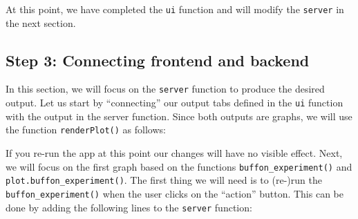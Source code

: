 \documentclass[12pt,]{krantz}
\newenvironment{Shaded}{\begin{snugshade}}{\end{snugshade}}
\newcommand{\KeywordTok}[1]{\textcolor[rgb]{0.27,0.27,0.27}{\textbf{#1}}}
\newcommand{\DataTypeTok}[1]{\textcolor[rgb]{0.27,0.27,0.27}{#1}}
\newcommand{\DecValTok}[1]{\textcolor[rgb]{0.06,0.06,0.06}{#1}}
\newcommand{\StringTok}[1]{\textcolor[rgb]{0.5,0.5,0.5}{#1}}
\newcommand{\CommentTok}[1]{\textcolor[rgb]{0.37,0.37,0.37}{\textit{#1}}}
\newcommand{\ControlFlowTok}[1]{\textcolor[rgb]{0.27,0.27,0.27}{\textbf{#1}}}
\newcommand{\OperatorTok}[1]{\textcolor[rgb]{0.43,0.43,0.43}{\textbf{#1}}}
\newcommand{\NormalTok}[1]{#1}
\begin{document}
At this point, we have completed the \texttt{ui} function and will
modify the \texttt{server} in the next section.

\subsection{Step 3: Connecting frontend and
backend}\label{step-3-connecting-frontend-and-backend}

In this section, we will focus on the \texttt{server} function to
produce the desired output. Let us start by ``connecting'' our output
tabs defined in the \texttt{ui} function with the output in the server
function. Since both outputs are graphs, we will use the function
\texttt{renderPlot()} as follows:

\begin{Shaded}
\end{Shaded}

If you re-run the app at this point our changes will have no visible
effect. Next, we will focus on the first graph based on the functions
\texttt{buffon\_experiment()} and \texttt{plot.buffon\_experiment()}.
The first thing we will need is to (re-)run the
\texttt{buffon\_experiment()} when the user clicks on the ``action''
button. This can be done by adding the following lines to the
\texttt{server} function:

\begin{Shaded}
\end{Shaded}
\end{document}

